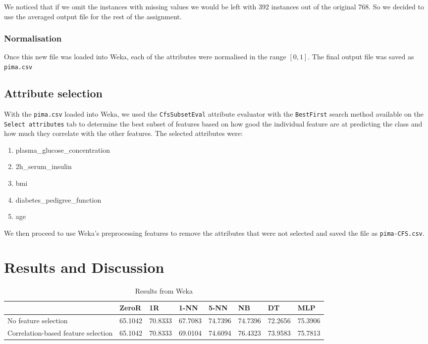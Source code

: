 \documentclass{article}
\renewcommand{\tt}{\texttt}
\begin{document}
We noticed that if we omit the instances with missing values we would be left with 392 instances out of the original 768. So we decided to use the averaged output file for the rest of the assignment.

\subsubsection{Normalisation}
Once this new file was loaded into Weka, each of the attributes were normalised in the range $[0, 1]$. The final output file was saved as \tt{pima.csv}

\subsection{Attribute selection}
With the \tt{pima.csv} loaded into Weka, we used the \tt{CfsSubsetEval} attribute evaluator with the \tt{BestFirst} search method available on the \tt{Select attributes} tab to determine the best subset of features based on how good the individual feature are at predicting the class and how much they correlate with the other features.
The selected attributes were:
\begin{enumerate}[1.]
\item plasma\_glucose\_concentration
\item 2h\_serum\_insulin
\item bmi
\item diabetes\_pedigree\_function
\item age
\end{enumerate} 

We then proceed to use Weka's preprocessing features to remove the attributes that were not selected and saved the file as \tt{pima-CFS.csv}.

\section{Results and Discussion}
\begin{table}[h]
\begin{tabular}{llllllll}
\hline
                                    & ZeroR   & 1R      & 1-NN    & 5-NN    & NB      & DT      & MLP     \\ \hline
No feature selection                & 65.1042 & 70.8333 & 67.7083 & 74.7396 & 74.7396 & 72.2656 & 75.3906 \\
Correlation-based feature selection & 65.1042 & 70.8333 & 69.0104 & 74.6094 & 76.4323 & 73.9583 & 75.7813 \\ \hline
\end{tabular}
\caption{Results from Weka}
\end{table}
\end{document}
